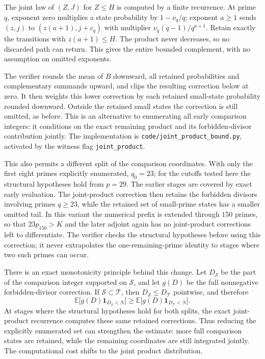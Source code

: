 \documentclass[11pt]{article}
\newcommand{\E}{\mathbb E}
\begin{document}
The joint law of $(Z,J)$ for $Z\leq H$ is computed by a finite recurrence.
At prime $q$, exponent zero multiplies a state probability by $1-\nu_q/q$;
exponent $a\geq1$ sends $(z,j)$ to $(z(a+1),j+c_q)$ with multiplier
$\nu_q(q-1)/q^{a+1}$. Retain exactly the transitions with $z(a+1)\leq H$.
The product never decreases, so no discarded path can return. This gives
the entire bounded complement, with no assumption on omitted exponents.

The verifier rounds the mean of $B$ downward, all retained probabilities
and complementary summands upward, and clips the resulting correction
below at zero. It then weights this lower correction by each retained
small-state probability rounded downward. Outside the retained small states
the correction is still omitted, as before. This is an alternative to
enumerating all early comparison integers: it conditions on the exact
remaining product and its forbidden-divisor contribution jointly.
The implementation is \texttt{code/joint\_product\_bound.py}, activated
by the witness flag \texttt{joint\_product}.

This also permits a different split of the comparison coordinates.
With only the first eight primes explicitly enumerated, $q_0=23$;
for the cutoffs tested here the structural hypotheses hold from $p=29$.
The earlier stages are covered by exact early evaluation. The joint-product
correction then retains the forbidden divisors involving primes $q\geq23$,
while the retained set of small-prime states has a smaller omitted tail.
In this variant the numerical prefix is extended through $150$ primes,
so that $23p_{150}>K$ and the later adjoint again has no joint-product
corrections left to differentiate. The verifier checks the structural
hypotheses before using this correction; it never extrapolates the
one-remaining-prime identity to stages where two such primes can occur.

There is an exact monotonicity principle behind this change. Let
$D_{\mathcal S}$ be the part of the comparison integer supported on
$\mathcal S$, and let $g(D)$ be the full nonnegative forbidden-divisor
correction. If $\mathcal S\subset\mathcal T$, then
$D_{\mathcal S}\leq D_{\mathcal T}$ pointwise, and therefore
\[
 \E\bigl[g(D)\mathbf1_{D_{\mathcal S}<N}\bigr]
 \geq \E\bigl[g(D)\mathbf1_{D_{\mathcal T}<N}\bigr].
\]
At stages where the structural hypotheses hold for both splits, the exact
joint-product recurrence computes these same retained corrections.
Thus reducing the explicitly enumerated set can strengthen the estimate:
more full comparison states are retained, while the remaining coordinates
are still integrated jointly. The computational cost shifts to the joint
product distribution.
\end{document}

